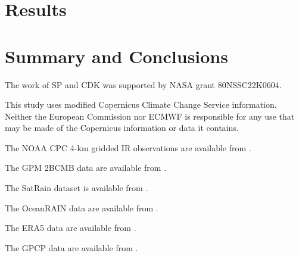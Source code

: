 \documentclass{ametsocV6.1}
\begin{document}

\section{Results}
\label{sec:results}


\section{Summary and Conclusions}
\label{sec:summary_and_conclusions}


\clearpage
\acknowledgments

The work of SP and CDK was supported by NASA grant 80NSSC22K0604.

This study uses modified Copernicus Climate Change Service information. Neither the European Commission nor ECMWF is responsible for any use that may be made of the Copernicus information or data it contains.


\datastatement


The NOAA CPC 4-km gridded IR observations are available from \citet{ncep_cpc_mergir_v1}.

The GPM 2BCMB data are available  from \citet{cmb_data}.

The SatRain dataset is available from \citet{satrain_dataset}.

The OceanRAIN data are available from \citet{ocean_rain_data}.

The ERA5 data are available from \citet{c3s_era5_single_levels}.

The GPCP data are available from \citet{gpcp_v33_precip}.




\end{document}
